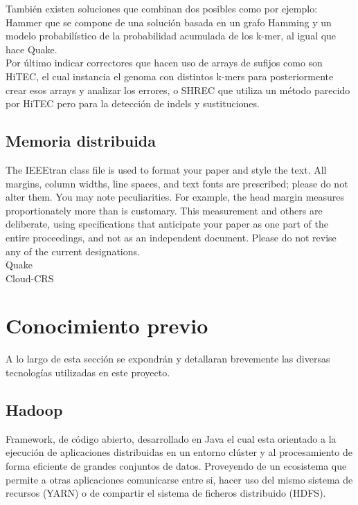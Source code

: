 \documentclass[conference]{IEEEtran}
\begin{document}
También existen soluciones que combinan dos posibles como por ejemplo: Hammer que se compone de una solución basada en un grafo Hamming y un modelo probabilístico de la probabilidad acumulada de los k-mer, al igual que hace Quake.\\

Por último indicar correctores que hacen uso de arrays de sufijos como son HiTEC, el cual instancia el genoma con distintos k-mers para posteriormente crear esos arrays y analizar los errores, o SHREC que utiliza un método parecido por HiTEC pero para la detección de indels y sustituciones.\\

\subsection{Memoria distribuida}

The IEEEtran class file is used to format your paper and style the text. All margins, 
column widths, line spaces, and text fonts are prescribed; please do not 
alter them. You may note peculiarities. For example, the head margin
measures proportionately more than is customary. This measurement 
and others are deliberate, using specifications that anticipate your paper 
as one part of the entire proceedings, and not as an independent document. 
Please do not revise any of the current designations.\\	

Quake\\

Cloud-CRS


\section{Conocimiento previo}

A lo largo de esta sección se expondrán y detallaran brevemente las diversas tecnologías utilizadas en este proyecto.

\subsection{Hadoop}
Framework, de código abierto, desarrollado en Java el cual esta orientado a la ejecución de aplicaciones distribuidas en un entorno clúster y al procesamiento de forma eficiente de grandes conjuntos de datos. Proveyendo de un ecosistema que permite a otras aplicaciones comunicarse entre si, hacer uso del mismo sistema de recursos (YARN) o de compartir el sistema de ficheros distribuido (HDFS).
\end{document}
